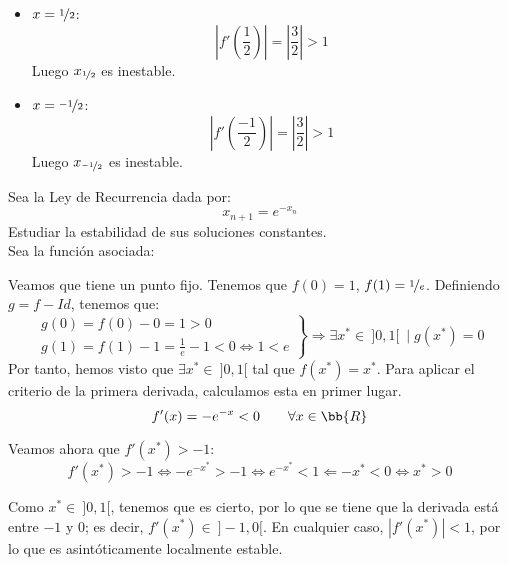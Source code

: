 \begin{ejemplo}
\begin{itemize}
        \item \ul{$x = \nicefrac{1}{2}$}:
        \begin{equation*}
            \left|f'\left(\dfrac{1}{2}\right)\right| = \left|\dfrac{3}{2}\right| > 1
        \end{equation*}
        Luego $x_{\nicefrac{1}{2}}$ es inestable.

        \item \ul{$x = \nicefrac{-1}{2}$}:
        \begin{equation*}
            \left|f'\left(\dfrac{-1}{2}\right)\right| = \left|\dfrac{3}{2}\right| > 1
        \end{equation*}
        Luego $x_{\nicefrac{-1}{2}}$ es inestable.
    \end{itemize}
\end{ejemplo}

\begin{ejercicio*}
    Sea la Ley de Recurrencia dada por:
    \begin{equation*}
        x_{n+1} = e^{-x_n}
    \end{equation*}
    Estudiar la estabilidad de sus soluciones constantes.\\

    Sea la función asociada:

    Veamos que tiene un punto fijo. Tenemos que $f(0)=1$, $f(1)=\nicefrac{1}{e}$. Definiendo $g=f-Id$, tenemos que:
    \begin{equation*}
        \left.\begin{array}{l}
            g(0)=f(0)-0 = 1>0\\
            g(1)=f(1)-1 = \frac{1}{e}-1 < 0 \Longleftrightarrow 1<e
        \end{array}\right\}\Longrightarrow \exists x^\ast\in ~]0,1[~\mid g(x^\ast)=0
    \end{equation*}
    Por tanto, hemos visto que $\exists x^\ast\in ~]0,1[$ tal que $f(x^\ast)=x^\ast$. Para aplicar el criterio de la primera derivada, calculamos esta en primer lugar.
    \begin{equation*}
        f'(x)=-e^{-x} < 0 \qquad \forall x\in \bb{R}
    \end{equation*}

    Veamos ahora que $f'(x^\ast)>-1$:
    \begin{equation*}
        f'(x^\ast)>-1 \Longleftrightarrow
        -e^{-x^\ast}>-1 \Longleftrightarrow
        e^{-x^\ast}<1 \Longleftarrow
        -x^\ast < 0 \Longleftrightarrow
        x^\ast > 0
    \end{equation*}

    Como $x^\ast\in ~]0,1[$, tenemos que es cierto, por lo que se tiene que la derivada está entre $-1$ y $0$; es decir, $f'(x^\ast)\in~]-1, 0[$. En cualquier caso, $|f'(x^\ast)|<1$, por lo que es asintóticamente localmente estable.
\end{ejercicio*}\vspace{1cm}

